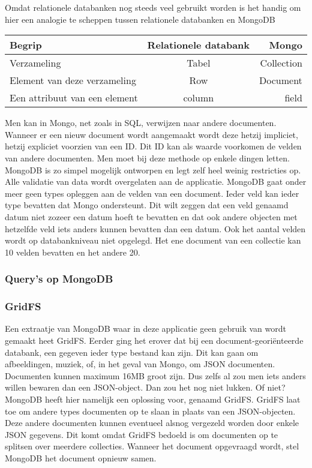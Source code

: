 \documentclass[a4paper,11pt]{article}
\newcommand{\head}[1]{\textnormal{\textbf{#1}}}
\begin{document}
Omdat relationele databanken nog steeds veel gebruikt worden is het handig om hier een analogie te scheppen tussen relationele databanken en MongoDB

\begin{tabular}{lcr}
\hline
\head{Begrip} & \head{Relationele databank} & \head{Mongo} \\
\hline
Verzameling & Tabel & Collection \\
Element van deze verzameling & Row & Document \\
Een attribuut van een element & column & field

\end{tabular}

Men kan in Mongo, net zoals in SQL, verwijzen naar andere documenten. Wanneer er een nieuw document wordt aangemaakt wordt deze hetzij impliciet, hetzij expliciet voorzien van een ID. Dit ID kan als waarde voorkomen de velden van andere documenten. Men moet bij deze methode op enkele dingen letten. MongoDB is zo simpel mogelijk ontworpen en legt zelf heel weinig restricties op. Alle validatie van data wordt overgelaten aan de applicatie. MongoDB gaat onder meer geen types opleggen aan de velden van een document. Ieder veld kan ieder type bevatten dat Mongo ondersteunt. Dit wilt zeggen dat een veld genaamd datum niet zozeer een datum hoeft te bevatten en dat ook andere objecten met hetzelfde veld iets anders kunnen bevatten dan een datum. Ook het aantal velden wordt op databankniveau niet opgelegd. Het ene document van een collectie kan 10 velden bevatten en het andere 20.

\subsubsection{Query's op MongoDB}


\subsubsection{GridFS}
Een extraatje van MongoDB waar in deze applicatie geen gebruik van wordt gemaakt heet GridFS. Eerder ging het erover dat bij een document-georiënteerde databank, een gegeven ieder type bestand kan zijn. Dit kan gaan om afbeeldingen, muziek, of, in het geval van Mongo, om JSON documenten. Documenten kunnen maximum 16MB groot zijn. Dus zelfs al zou men iets anders willen bewaren dan een JSON-object. Dan zou het nog niet lukken. Of niet? MongoDB heeft hier namelijk een oplossing voor, genaamd GridFS. GridFS laat toe om andere types documenten op te slaan in plaats van een JSON-objecten. Deze andere documenten kunnen eventueel alsnog vergezeld worden door enkele JSON gegevens. Dit komt omdat GridFS bedoeld is om documenten op te splitsen over meerdere collecties. Wanneer het document opgevraagd wordt, stel MongoDB het document opnieuw samen.
\end{document}
